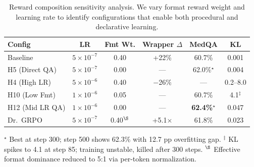 \documentclass{article}
\begin{document}
\begin{table}[h]
\centering
\caption{Reward composition sensitivity analysis. We vary format reward weight and learning rate to identify configurations that enable both procedural and declarative learning.}
\label{tab:reward_sensitivity}
\begin{tabular}{lccccc}
\toprule
\textbf{Config} & \textbf{LR} & \textbf{Fmt Wt.} & \textbf{Wrapper $\Delta$} & \textbf{MedQA} & \textbf{KL} \\
\midrule
Baseline & $5 \times 10^{-7}$ & 0.40 & +22\% & 60.7\% & 0.001 \\
H5 (Direct QA) & $5 \times 10^{-7}$ & 0.00 & --- & 62.0\%$^\star$ & 0.004 \\
H4 (High LR) & $5 \times 10^{-6}$ & 0.40 & $-$26\% & --- & 0.2--8.0 \\
\midrule
H10 (Low Fmt) & $1 \times 10^{-6}$ & 0.05 & --- & 60.7\% & 4.1$^\ddagger$ \\
H12 (Mid LR QA) & $1 \times 10^{-6}$ & 0.00 & --- & \textbf{62.4\%}$^\star$ & 0.047 \\
Dr.~GRPO & $5 \times 10^{-7}$ & 0.40$^\S$ & +5.1$\times$ & 61.8\% & 0.023 \\
\bottomrule
\end{tabular}
{\footnotesize $^\star$ Best at step 300; step 500 shows 62.3\% with 12.7 pp overfitting gap. $^\ddagger$ KL spikes to 4.1 at step 85; training unstable, killed after 300 steps. $^\S$ Effective format dominance reduced to 5:1 via per-token normalization.}
\end{table}
\end{document}
